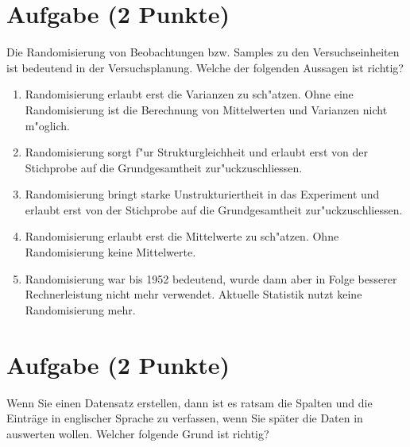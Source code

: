\documentclass[a4paper, 10pt]{scrartcl}\usepackage[]{graphicx}\usepackage[]{xcolor}
\begin{document}
\section{Aufgabe \hfill (2 Punkte)}

Die Randomisierung von Beobachtungen bzw. Samples zu den Versuchseinheiten
ist bedeutend in der Versuchsplanung. Welche der folgenden Aussagen ist richtig?



\begin{enumerate}
\item [\textbf{A} \msquare] Randomisierung erlaubt erst die Varianzen zu sch{"a}tzen. Ohne eine Randomisierung ist die Berechnung von Mittelwerten und Varianzen nicht m{"o}glich.
\item [\textbf{B} \msquare] Randomisierung sorgt f{"u}r Strukturgleichheit und erlaubt erst von der Stichprobe auf die Grundgesamtheit zur{"u}ckzuschliessen.
\item [\textbf{C} \msquare] Randomisierung bringt starke Unstrukturiertheit in das Experiment und erlaubt erst von der Stichprobe auf die Grundgesamtheit zur{"u}ckzuschliessen.
\item [\textbf{D} \msquare] Randomisierung erlaubt erst die Mittelwerte zu sch{"a}tzen. Ohne Randomisierung keine Mittelwerte.
\item [\textbf{E} \msquare] Randomisierung war bis 1952 bedeutend, wurde dann aber in Folge besserer Rechnerleistung nicht mehr verwendet. Aktuelle Statistik nutzt keine Randomisierung mehr.
\end{enumerate}

\section{Aufgabe \hfill (2 Punkte)}

Wenn Sie einen Datensatz erstellen, dann ist es ratsam die Spalten und die
Eintr{\"a}ge in englischer Sprache zu verfassen, wenn Sie sp{\"a}ter die Daten in
\Rlogo auswerten wollen. Welcher folgende Grund ist richtig?
\end{document}
